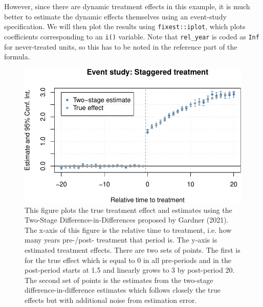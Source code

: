 However, since there are dynamic treatment effects in this example, it
is much better to estimate the dynamic effects themselves using an
event-study specification. We will then plot the results using
\texttt{fixest::iplot}, which plots coefficients corresponding to an
\texttt{i()} variable. Note that \texttt{rel\_year} is coded as
\texttt{Inf} for never-treated units, so this has to be noted in the
reference part of the formula.

\begin{Schunk}
\begin{figure}
\includegraphics[width=1\linewidth]{did2s_files/figure-latex/dynamic-1} \caption[This figure plots the true treatment effect and estimates using the Two-Stage Difference-in-Differences proposed by Gardner (2021)]{This figure plots the true treatment effect and estimates using the Two-Stage Difference-in-Differences proposed by Gardner (2021). The x-axis of this figure is the relative time to treatment, i.e. how many years pre-/post- treatment that period is. The y-axis is estimated treatment effects. There are two sets of points. The first is for the true effect which is equal to 0 in all pre-periods and in the post-period starts at 1.5 and linearly grows to 3 by post-period 20. The second set of points is the estimates from the two-stage difference-in-difference estimates which follows closely the true effects but with additional noise from estimation error.}\label{fig:dynamic}
\end{figure}
\end{Schunk}

